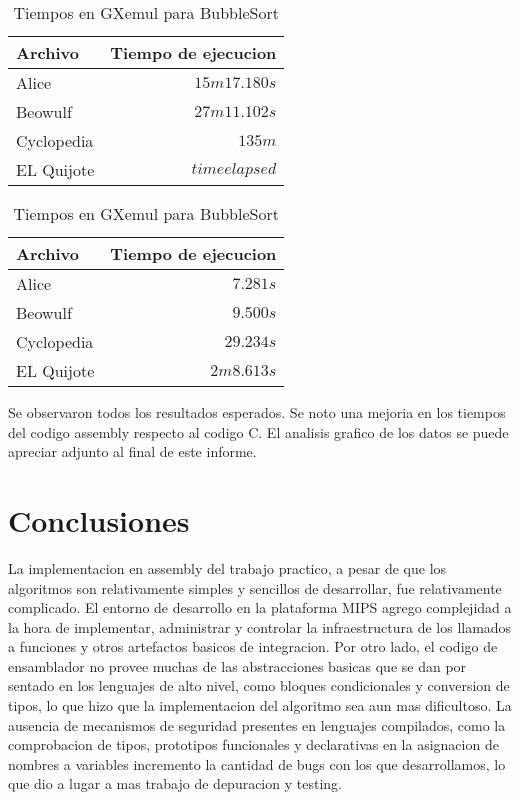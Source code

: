 \documentclass[a4paper,11pt]{article}
\begin{document}
\FloatBarrier

\begin{table}[h!t]
\centering
\begin{tabular}{ | l | r | }
  \hline
  Archivo          & Tiempo de ejecucion \\ \hline
  Alice				 & \(15m 17.180s\) \\
  Beowulf     & \(27m 11.102s\) \\
  Cyclopedia     & \(135m\) \\
  EL Quijote      & \(time elapsed\) \\
  \hline
\end{tabular}
\caption{Tiempos en GXemul para BubbleSort}
\label{tab:resultados}
\end{table}

\FloatBarrier

\begin{table}[h!t]
\centering
\begin{tabular}{ | l | r | }
  \hline
  Archivo          & Tiempo de ejecucion \\ \hline
  Alice				 & \(7.281s\) \\
  Beowulf     & \(9.500s\) \\
  Cyclopedia     & \(29.234s\) \\
  EL Quijote      & \(2m 8.613s\) \\
  \hline
\end{tabular}
\caption{Tiempos en GXemul para BubbleSort}
\label{tab:resultados}
\end{table}

\FloatBarrier

Se observaron todos los resultados esperados. Se noto una mejoria en los tiempos del codigo assembly respecto al codigo C. El analisis grafico de los datos se puede apreciar adjunto al final de este informe.

\section{Conclusiones}

La implementacion en assembly del trabajo practico, a pesar de que los algoritmos son relativamente simples y sencillos de desarrollar, fue
relativamente complicado. El entorno de desarrollo en la plataforma MIPS agrego complejidad a la hora de implementar, administrar y controlar la infraestructura de los llamados a
funciones y otros artefactos basicos de integracion. Por otro lado, el codigo
de ensamblador no provee muchas de las abstracciones basicas que se dan por
sentado en los lenguajes de alto nivel, como bloques condicionales y conversion
de tipos, lo que hizo que la implementacion del algoritmo sea aun mas
dificultoso. La ausencia de mecanismos de seguridad presentes en
lenguajes compilados, como la comprobacion de tipos, prototipos funcionales y
declarativas en la asignacion de nombres a variables incremento la cantidad
de bugs con los que desarrollamos, lo que dio a lugar a mas trabajo de depuracion y testing.
\end{document}
